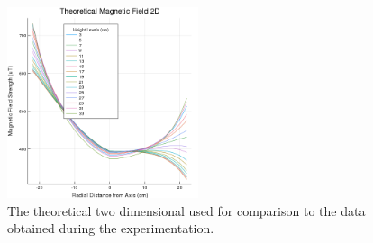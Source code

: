 \documentclass[a4paper]{article}
\begin{document}
\begin{figure}[H]
  \begin{center}
    \includegraphics[width=0.5\textwidth]{2DPlotTheoretical.png}
  \end{center}
  \caption{The theoretical two dimensional used for comparison to the data
    obtained during the experimentation.}
  \label{Theoretical 2-D plot}
\end{figure}
\end{document}
